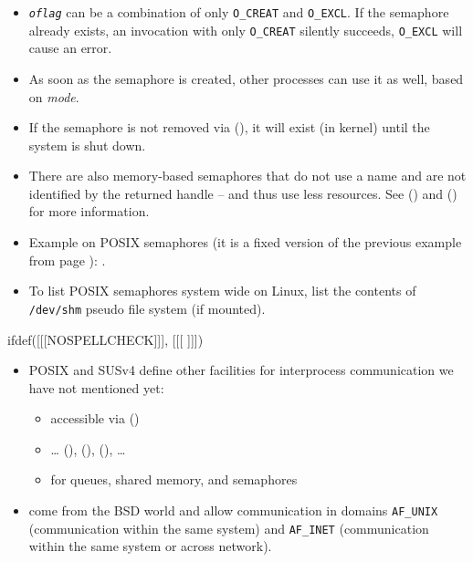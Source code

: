 \begin{itemize}
\item \emph{\texttt{oflag}} can be a combination of only \texttt{O\_CREAT} and
\texttt{O\_EXCL}.  If the semaphore already exists, an invocation with only
\texttt{O\_CREAT} silently succeeds, \texttt{O\_EXCL} will cause an error.
\item As soon as the semaphore is created, other processes can use it as
well, based on \emph{mode}.
\item If the semaphore is not removed via (), it will exist
(in kernel) until the system is shut down.
\item There are also memory-based semaphores that do not use a name and are not
identified by the returned handle -- and thus use less resources.  See
() and () for more information.
\item Example on POSIX semaphores (it is a fixed version of the previous example
 from page \pageref{RACE_C}):
.
\item To list POSIX semaphores system wide on Linux, list the contents of
\texttt{/dev/shm} pseudo file system (if mounted).
\end{itemize}


ifdef([[[NOSPELLCHECK]]], [[[
]]])

\begin{slide}
\begin{itemize}
\item POSIX and SUSv4 define other facilities for interprocess communication we
have not mentioned yet:
    \begin{itemize}
    \item {} accessible via ()
    \item {} \dots{} (),
    (), (), \dots{} 
    \item {} for queues, shared memory, and semaphores
    \end{itemize}
\item {} come from the BSD world and allow communication in domains
\texttt{AF\_UNIX} (communication within the same system) and \texttt{AF\_INET}
(communication within the same system or across network).
\end{itemize}
\end{slide}

